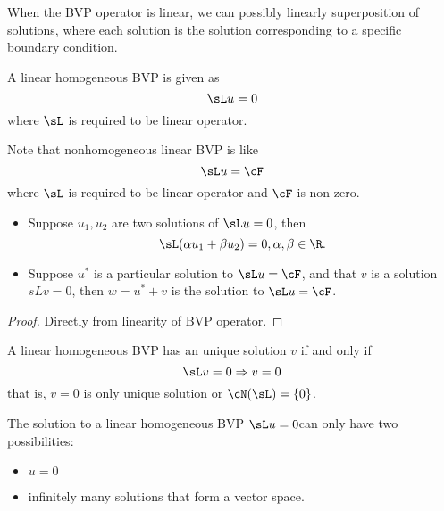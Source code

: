 \begin{refsection}
\begin{remark}
When the BVP operator is linear, we can possibly linearly superposition of solutions, where each solution is the solution corresponding to a specific boundary condition.
\end{remark}



\begin{definition}
	A linear homogeneous BVP is given as
	$$\sL u = 0$$
	where $\sL$ is required to be linear operator.
\end{definition}

\begin{remark}
	Note that nonhomogeneous linear BVP is like 
$$\sL u = \cF$$
where $\sL$ is required to be linear operator and $\cF$ is non-zero.
\end{remark}


\begin{lemma}\cite[18]{griffiths2015essential}\hfill
\begin{itemize}
	\item Suppose $u_1,u_2$ are two solutions of $\sL u = 0$, then
	$$\sL(\alpha u_1 + \beta u_2) = 0, \alpha,\beta\in\R.$$
	\item Suppose $u^*$ is a particular solution to $\sL u = \cF$, and that $v$ is a solution $sL v = 0$, then
	$w = u^* + v$ is the solution to $\sL u = \cF$.
\end{itemize}
\end{lemma}
\begin{proof}
Directly from linearity of BVP operator.
\end{proof}



\begin{lemma}
	A linear homogeneous BVP has an unique solution $v$ if and only if
	$$\sL v = 0 \Rightarrow v=0$$
	that is, $v=0$ is only unique solution or $\cN(\sL)=\{0\}$.
\end{lemma}

\begin{corollary}
	The solution to a linear homogeneous BVP $\sL u =0$can only have two possibilities:
	\begin{itemize}
		\item $u=0$
		\item infinitely many solutions that form a vector space.
	\end{itemize}
\end{corollary}


\end{refsection}
